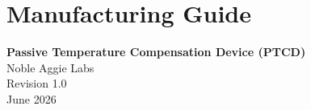 \documentclass[12pt, letterpaper]{report}%
\begin{document}
\chapter*{Manufacturing Guide}
\setcounter{section}{0}
\renewcommand{\thesection}{\arabic{section}}

\begin{center}
	{\Large \textbf{Passive Temperature Compensation Device (PTCD)}} \\[4pt]
	Noble Aggie Labs \\
	Revision 1.0 \\
	June 2026
\end{center}

\bigskip

\end{document}
